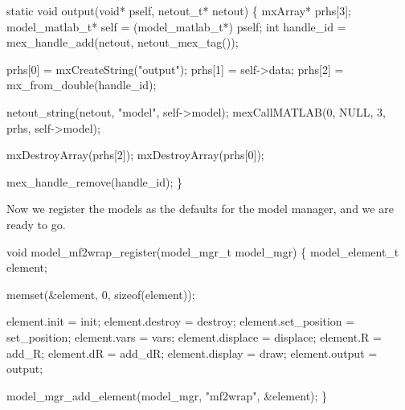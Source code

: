 \nwenddocs{}\plusendmoddef
static void output(void* pself, netout_t* netout)
\{
    mxArray* prhs[3];
    model_matlab_t* self = (model_matlab_t*) pself;
    int handle_id = mex_handle_add(netout, netout_mex_tag());

    prhs[0] = mxCreateString("output");
    prhs[1] = self->data;
    prhs[2] = mx_from_double(handle_id);

    netout_string(netout, "model", self->model);
    mexCallMATLAB(0, NULL, 3, prhs, self->model); 

    mxDestroyArray(prhs[2]);
    mxDestroyArray(prhs[0]);

    mex_handle_remove(handle_id);
\}

\nwendcode{}\nwdocspar

Now we register the models as the defaults for the model manager,
and we are ready to go.

\nwenddocs{}\endmoddef
void model_mf2wrap_register(model_mgr_t model_mgr)
\{
    model_element_t  element;

    memset(&element,  0, sizeof(element));

    element.init         = init;
    element.destroy      = destroy;
    element.set_position = set_position;
    element.vars         = vars;
    element.displace     = displace;
    element.R            = add_R;
    element.dR           = add_dR;
    element.display      = draw;
    element.output       = output; 

    model_mgr_add_element(model_mgr, "mf2wrap", &element);
\}

\nwendcode{}

%
%
%
%
%
%
%
\nwdocspar

\nwenddocs{}
